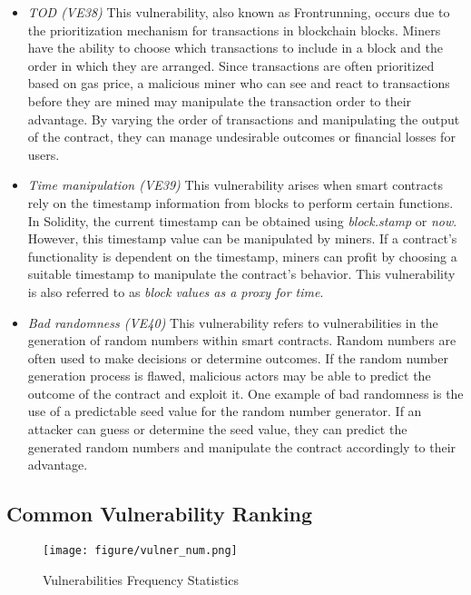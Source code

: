 \documentclass[manuscript,screen]{acmart}
\begin{document}
\begin{itemize}
  \item \textit{TOD (VE38)} This vulnerability, also known as Frontrunning, occurs due to the prioritization mechanism for transactions in blockchain blocks. Miners have the ability to choose which transactions to include in a block and the order in which they are arranged. Since transactions are often prioritized based on gas price, a malicious miner who can see and react to transactions before they are mined may manipulate the transaction order to their advantage. By varying the order of transactions and manipulating the output of the contract, they can manage undesirable outcomes or financial losses for users. 
  \item \textit{Time manipulation (VE39)}  This vulnerability arises when smart contracts rely on the timestamp information from blocks to perform certain functions. In Solidity, the current timestamp can be obtained using \textit{block.stamp} or \textit{now}. However, this timestamp value can be manipulated by miners. If a contract's functionality is dependent on the timestamp, miners can profit by choosing a suitable timestamp to manipulate the contract's behavior. This vulnerability is also referred to as \textit{block values as a proxy for time}.
  \item \textit{Bad randomness (VE40)} This vulnerability refers to vulnerabilities in the generation of random numbers within smart contracts. Random numbers are often used to make decisions or determine outcomes. If the random number generation process is flawed, malicious actors may be able to predict the outcome of the contract and exploit it. One example of bad randomness is the use of a predictable seed value for the random number generator. If an attacker can guess or determine the seed value, they can predict the generated random numbers and manipulate the contract accordingly to their advantage.
\end{itemize}


\subsection{Common Vulnerability Ranking}
\begin{figure}[!ht]
	\centering
	\texttt{[image: figure/vulner\_num.png]}
	\caption{Vulnerabilities Frequency Statistics}
	\label{vulner_num}
\end{figure}
\end{document}
